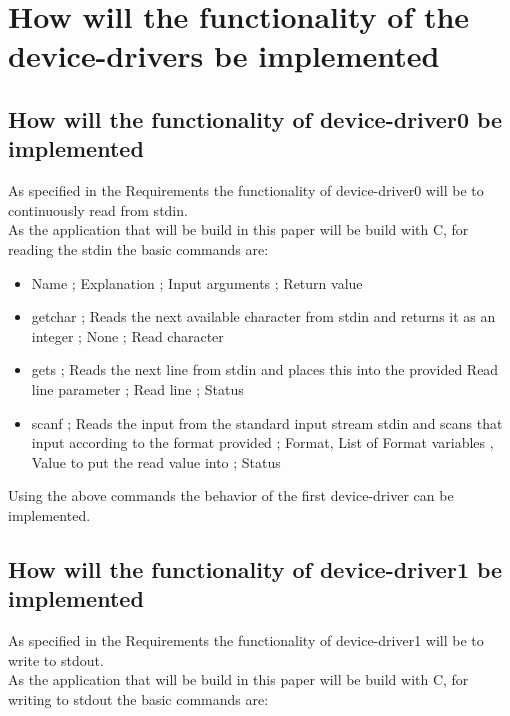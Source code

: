 \hypertarget{how-will-the-functionality-of-the-device-drivers-be-implemented}{%
\section{How will the functionality of the device-drivers be
implemented}\label{how-will-the-functionality-of-the-device-drivers-be-implemented}}

\hypertarget{how-will-the-functionality-of-device-driver0-be-implemented}{%
\subsection{How will the functionality of device-driver0 be
implemented}\label{how-will-the-functionality-of-device-driver0-be-implemented}}

As specified in the Requirements the functionality of device-driver0
will be to continuously read from stdin.\\
As the application that will be build in this paper will be build with
C, for reading the stdin the basic commands are:

\begin{itemize}
\tightlist
\item
  Name ; Explanation ; Input arguments ; Return value
\item
  getchar ; Reads the next available character from stdin and returns it
  as an integer ; None ; Read character
\item
  gets ; Reads the next line from stdin and places this into the
  provided Read line parameter ; Read line ; Status
\item
  scanf ; Reads the input from the standard input stream stdin and scans
  that input according to the format provided ; Format, List of Format
  variables , Value to put the read value into ; Status
\end{itemize}

Using the above commands the behavior of the first device-driver can be
implemented.

\hypertarget{how-will-the-functionality-of-device-driver1-be-implemented}{%
\subsection{How will the functionality of device-driver1 be
implemented}\label{how-will-the-functionality-of-device-driver1-be-implemented}}

As specified in the Requirements the functionality of device-driver1
will be to write to stdout.\\
As the application that will be build in this paper will be build with
C, for writing to stdout the basic commands are:


